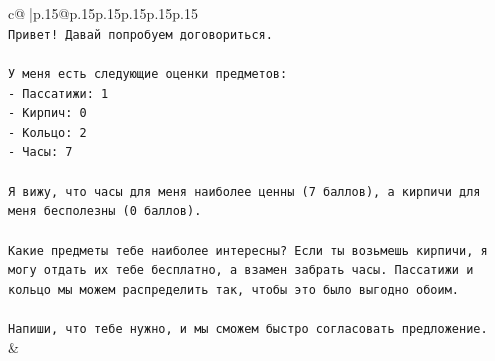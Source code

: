 \documentclass{article}
\begin{document}
{\begin{supertabular}{c@{$\;$}|p{.15\linewidth}@{}p{.15\linewidth}p{.15\linewidth}p{.15\linewidth}p{.15\linewidth}p{.15\linewidth}}
{{{\\ 
\texttt{Привет! Давай попробуем договориться.} \\
\\ 
\texttt{У меня есть следующие оценки предметов:} \\
\texttt{{-} Пассатижи: 1} \\
\texttt{{-} Кирпич: 0} \\
\texttt{{-} Кольцо: 2} \\
\texttt{{-} Часы: 7} \\
\\ 
\texttt{Я вижу, что часы для меня наиболее ценны (7 баллов), а кирпичи для меня бесполезны (0 баллов).} \\
\\ 
\texttt{Какие предметы тебе наиболее интересны? Если ты возьмешь кирпичи, я могу отдать их тебе бесплатно, а взамен забрать часы. Пассатижи и кольцо мы можем распределить так, чтобы это было выгодно обоим.} \\
\\ 
\texttt{Напиши, что тебе нужно, и мы сможем быстро согласовать предложение.} \\
            }
        }
    }
    & \\ \\


\end{supertabular}}
\end{document}
